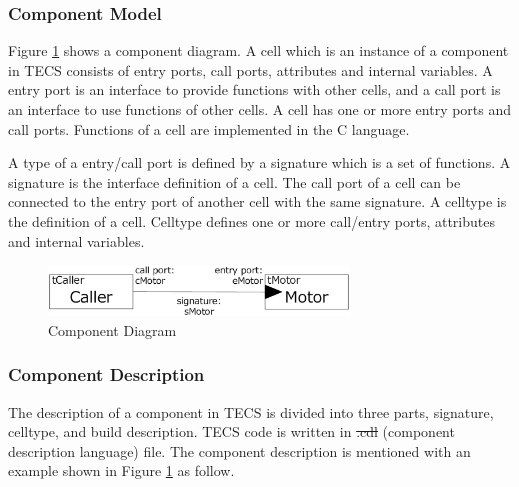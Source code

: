 \documentclass{sig-alternate-05-2015}
\providecommand{\DIFadd}[1]{{\protect\color{blue}\uwave{#1}}} %
\providecommand{\DIFdel}[1]{{\protect\color{red}\sout{#1}}}                      %
\providecommand{\DIFaddbegin}{} %
\providecommand{\DIFaddend}{} %
\providecommand{\DIFdelbegin}{} %
\providecommand{\DIFdelend}{} %
\begin{document}
\subsubsection{Component Model}
Figure \ref{fig:component} shows a component diagram.
A {\myit cell} which is an instance of a component in TECS consists of {\myit entry} ports, {\myit call} ports, attributes and internal variables.
A {\myit entry} port is an interface to provide functions with other {\myit cell}s, and a {\myit call} port is an interface to use functions of other {\myit cell}s.
A {\myit cell} has one or more {\myit entry} ports and {\myit call} ports.
Functions of a {\myit cell} are implemented in the C language.

A type of a {\myit entry}/{\myit call} port is defined by a {\myit signature} which is a set of functions.
A {\myit signature} is the interface definition of a {\myit cell}.
The {\myit call} port of a {\myit cell} can be connected to the {\myit entry} port of another {\myit cell} with the same {\myit signature}.
A {\myit celltype} is the definition of a {\myit cell}.
{\myit Celltype} defines one or more {\myit call}/{\myit entry} ports, attributes and internal variables.

\begin{figure}[t]
    \centering
    \includegraphics[width=8cm,clip]{figure/component_diagram.eps}
    \vspace{1mm}
    \caption{Component Diagram}
    \vspace{1mm}
    \label{fig:component}
\end{figure}

\subsubsection{Component Description}
The description of a component in TECS is divided into three parts, {\myit signature}, {\myit celltype}, and build description.
TECS code is written in \DIFdelbegin \DIFdel{.cdl }\DIFdelend \DIFaddbegin \DIFadd{CDL }\DIFaddend (component description language) file.
The component description is mentioned with an example shown in Figure \ref{fig:component} as follow.
\end{document}
